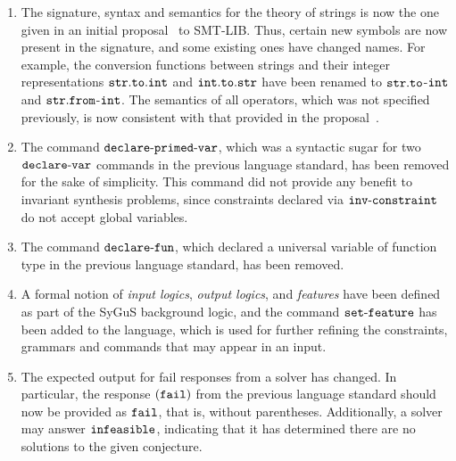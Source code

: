 \documentclass[english,a4paper,10pt]{article}
\begin{document}
\begin{enumerate}
\item
The signature, syntax and semantics for the theory of strings
is now the one given in an initial proposal~\cite{smtlibStrings} to SMT-LIB.
Thus, certain new symbols are now present in the signature,
and some existing ones have changed names.
For example,
the conversion functions between strings and their integer representations
${\tt str.to.int}$ and ${\tt int.to.str}$ have been renamed to
${\tt str.to}$-${\tt int}$ and ${\tt str.from}$-${\tt int}$.
The semantics of all operators,
which was not specified previously,
is now consistent with that provided in the proposal~\cite{smtlibStrings}.


\item The command ${\tt declare\mbox{-}primed\mbox{-}var}$, which was a syntactic
sugar for two ${\tt declare\mbox{-}var}$ commands in the previous language standard, has been removed
for the sake of simplicity.
This command did not provide any benefit to
invariant synthesis problems, since constraints declared via ${\tt inv\mbox{-}constraint}$
do not accept global variables.



\item 
The command ${\tt declare\mbox{-}fun}$,
which declared a universal variable of function type
in the previous language standard,
has been removed.

\item
A formal notion of \emph{input logics}, \emph{output logics}, and 
\emph{features} have been defined as part of the SyGuS background logic,
and the command ${\tt set\mbox{-}feature}$ %
has been added to the language,
which is used for further refining
the constraints, grammars and commands that may appear in an input.

\item The expected output for fail responses from a solver has changed.
In particular,
the response ${\tt (fail)}$ from the previous language standard
should now be provided as ${\tt fail}$, that is, without parentheses.
Additionally, a solver may answer ${\tt infeasible}$, indicating
that it has determined there are no solutions to the given conjecture.

\end{enumerate}
\end{document}
